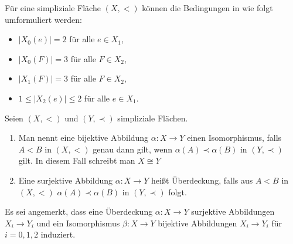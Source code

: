 \documentclass[12pt,titlepage]{article}
\begin{document}
\begin{bemerkung}
Für eine simpliziale Fläche $(X,<)$ können die Bedingungen in  wie folgt umformuliert werden:
\begin{itemize}
\item $\vert X_{0}(e)\vert=2$ für alle $e \in X_{1}$,
\item $\vert X_{0}(F)\vert=3$ für alle $F \in X_{2}$,
\item $\vert X_{1}(F)\vert=3$ für alle $F \in X_{2}$,
\item $1\leq  \vert X_{2}(e)\vert \leq 2$ für alle $e \in X_{1}$.

\end{itemize}
\end{bemerkung}

\begin{definition} Seien $(X,<)$ und $(Y,\prec)$ simpliziale Flächen.
\begin{enumerate}
 \item Man nennt eine bijektive Abbildung $\alpha: X \to Y$ einen Isomorphismus, falls $A<B$ in $(X,<)$ genau dann gilt, wenn $\alpha(A) \prec \alpha(B)$ in $(Y,\prec)$ gilt. In diesem Fall schreibt man $X \cong Y$
\item Eine surjektive Abbildung $\alpha: X \to Y$ heißt Überdeckung, falls aus $A<B$ in $(X,<)$  $\alpha(A) \prec \alpha(B)$ in $(Y,\prec)$ folgt. 
\end{enumerate}
\end{definition}
Es sei angemerkt, dass eine Überdeckung $\alpha:X\to Y$ surjektive Abbildungen $X_{i} \to Y_{i}$ und ein Isomorphismus $\beta:X \to Y$ bijektive Abbildungen $X_{i} \to Y_{i}$ für $i=0,1,2$ induziert.
\end{document}
